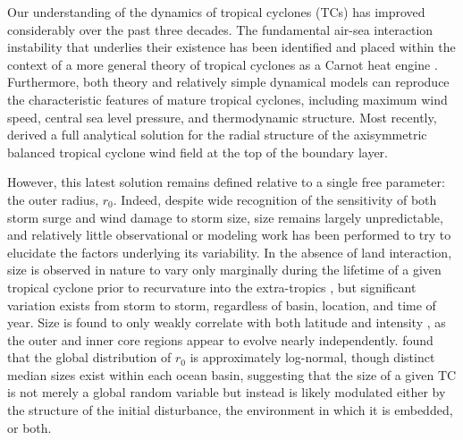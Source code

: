 \documentclass[12pt]{article}
\begin{document}
Our understanding of the dynamics of tropical cyclones (TCs) has improved considerably over the past three decades. The fundamental air-sea interaction instability that underlies their existence has been identified and placed within the context of a more general theory of tropical cyclones as a Carnot heat engine \citep{Emanuel_1986}. Furthermore, both theory and relatively simple dynamical models \citep{Emanuel_1995a, Rotunno_Emanuel_1987} can reproduce the characteristic features of mature tropical cyclones, including maximum wind speed, central sea level pressure, and thermodynamic structure. Most recently, \cite{Emanuel_Rotunno_2011} derived a full analytical solution for the radial structure of the axisymmetric balanced tropical cyclone wind field at the top of the boundary layer.

However, this latest solution remains defined relative to a single free parameter: the outer radius, $r_0$. Indeed, despite wide recognition of the sensitivity of both storm surge \citep{Irish_Resio_Ratcliff_2008} and wind damage \citep{Iman_Johnson_Watson_2005} to storm size, size remains largely unpredictable, and relatively little observational or modeling work has been performed to try to elucidate the factors underlying its variability. In the absence of land interaction, size is observed in nature to vary only marginally during the lifetime of a given tropical cyclone prior to recurvature into the extra-tropics \citep{Merrill_1984, Frank_1977, Chavas_Emanuel_2010, Cheng-Shang_Cheung_Wei-Ting_Elsberry_2010}, but significant variation exists from storm to storm, regardless of basin, location, and time of year.  Size is found to only weakly correlate with both latitude and intensity \citep{Merrill_1984, Weatherford_Gray_1988, Chavas_Emanuel_2010}, as the outer and inner core regions appear to evolve nearly independently.  \cite{Chavas_Emanuel_2010} found that the global distribution of $r_0$ is approximately log-normal, though distinct median sizes exist within each ocean basin, suggesting that the size of a given TC is not merely a global random variable but instead is likely modulated either by the structure of the initial disturbance, the environment in which it is embedded, or both.
\end{document}
